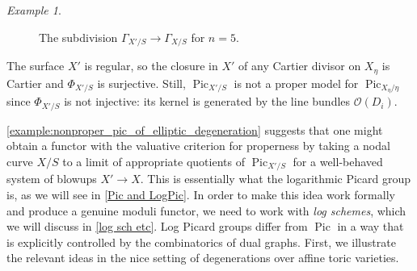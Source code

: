 \documentclass[a4paper,11pt]{amsart} %
\numberwithin{equation}{subsection}
\newcommand{\on}[1]{\operatorname{#1}}
\newcommand{\ca}[1]{{\mathcal{#1}}}
\theoremstyle{definition}
\theoremstyle{plain}%
\theoremstyle{remark}
\newtheorem{example}[definition]{Example}
\newcommand{\Tcomment}[1]{{\color{red}T: #1}}
\begin{document}
\begin{example}
\begin{figure}[ht]
\begin{center}

\end{center}
    
    \caption{The subdivision $\Gamma_{X'/S} \to \Gamma_{X/S}$ for $n=5$.}\label{graph}
\end{figure}

The surface $X'$ is regular, so the closure in $X'$ of any Cartier divisor on $X_\eta$ is Cartier and $\Phi_{X'/S}$ is surjective. Still, $\on{Pic}_{X'/S}$ is not a proper model for $\on{Pic}_{X_\eta/\eta}$ since $\Phi_{X'/S}$ is not injective: its kernel is generated by the line bundles $\ca O(D_i)$.
\end{example}

    \ref{example:nonproper_pic_of_elliptic_degeneration} suggests that one might obtain a functor with the valuative criterion for properness by taking a nodal curve $X/S$ to a limit of appropriate quotients of $\on{Pic}_{X'/S}$ for a well-behaved system of blowups $X' \to X$. This is essentially what the logarithmic Picard group is, as we will see in \ref{Pic and LogPic}. In order to make this idea work formally and produce a genuine moduli functor, we need to work with \emph{log schemes}, which we will discuss in \ref{log sch etc}. Log Picard groups differ from $\on{Pic}$ in a way that is explicitly controlled by the combinatorics of dual graphs. First, we illustrate the relevant ideas in the nice setting of degenerations over affine toric varieties.


\end{document}
